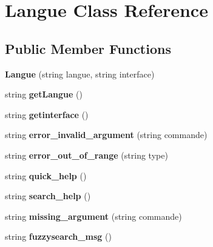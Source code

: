 \hypertarget{classLangue}{\section{Langue Class Reference}
\label{classLangue}
}
\subsection*{Public Member Functions}
\begin{DoxyCompactItemize}
\item 
\hypertarget{classLangue_a66324ea080f708a9a65bef6f2abb30f0}{{\bfseries Langue} (string langue, string interface)}\label{classLangue_a66324ea080f708a9a65bef6f2abb30f0}

\item 
\hypertarget{classLangue_a31d2e6b16e34c32f32d00f6396716613}{string {\bfseries get\-Langue} ()}\label{classLangue_a31d2e6b16e34c32f32d00f6396716613}

\item 
\hypertarget{classLangue_a4851dddec7118cbe6c15a09f6aaf97c9}{string {\bfseries getinterface} ()}\label{classLangue_a4851dddec7118cbe6c15a09f6aaf97c9}

\item 
\hypertarget{classLangue_aa12098dd3e7c18aff84605ba60ad3dde}{string {\bfseries error\-\_\-invalid\-\_\-argument} (string commande)}\label{classLangue_aa12098dd3e7c18aff84605ba60ad3dde}

\item 
\hypertarget{classLangue_a98a6d8817619e88e64471b52bbdf8000}{string {\bfseries error\-\_\-out\-\_\-of\-\_\-range} (string type)}\label{classLangue_a98a6d8817619e88e64471b52bbdf8000}

\item 
\hypertarget{classLangue_a1aa1e835519431eca72ae75e1632d85e}{string {\bfseries quick\-\_\-help} ()}\label{classLangue_a1aa1e835519431eca72ae75e1632d85e}

\item 
\hypertarget{classLangue_a6b89d0846cbbca7ea2fe090194d34c0a}{string {\bfseries search\-\_\-help} ()}\label{classLangue_a6b89d0846cbbca7ea2fe090194d34c0a}

\item 
\hypertarget{classLangue_a84ad905311f1273fd3dddaa203aefa1d}{string {\bfseries missing\-\_\-argument} (string commande)}\label{classLangue_a84ad905311f1273fd3dddaa203aefa1d}

\item 
\hypertarget{classLangue_a7271a81210956277a741b9cf487f432e}{string {\bfseries fuzzysearch\-\_\-msg} ()}\label{classLangue_a7271a81210956277a741b9cf487f432e}


\end{DoxyCompactItemize}
